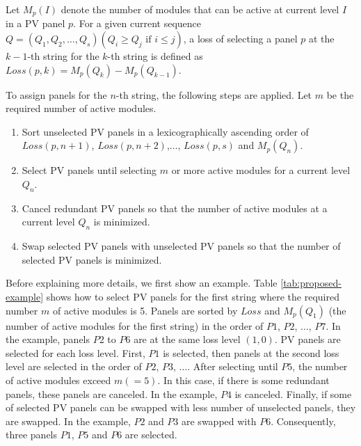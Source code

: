 \documentclass[conference]{IEEEtran}
\begin{document}
Let $M_{p}(I)$ denote the number of modules that can be active at current level $I$ in a PV panel $p$. 
For a given current sequence $Q = (Q_{1},Q_{2},\ldots ,Q_{s}) (Q_{i} \geq Q_{j} \mbox{\ if\ } i \leq j)$, 
a loss of selecting a panel $p$ at the $k-1$-th string for the $k$-th string is defined as 
$Loss(p,k) = M_{p}(Q_{k}) - M_{p}(Q_{k-1})$. 

%

To assign panels for the $n$-th string, the following steps are applied. Let $m$ be the required number of active modules.
\begin{enumerate}
\item Sort unselected PV panels in a lexicographically ascending order of $Loss(p,n+1)$, $Loss(p,n+2)$,$\ldots$, $Loss(p,s)$ and $M_{p}(Q_{n})$.
\item Select PV panels until selecting $m$ or more active modules for a current level $Q_{n}$.
\item Cancel redundant PV panels so that the number of active modules at a current level $Q_{n}$ is minimized.
\item Swap selected PV panels with unselected PV panels so that the number of selected PV panels is minimized.
\end{enumerate}

Before explaining more details, we first show an example. Table \ref{tab:proposed-example} shows how to select PV panels for the first string where the required number $m$ of active modules is 5. 
Panels are sorted by $Loss$ and $M_{p}(Q_{1})$ (the number of active modules for the first string) in the order of $P1$, $P2$, $\ldots$, $P7$. 
In the example, panels $P2$ to $P6$ are at the same loss level $(1,0)$. 
PV panels are selected for each loss level. First, $P1$ is selected, then panels at the second loss level are selected in the order of $P2$, $P3$, $\ldots$. After selecting until $P5$, the number of active modules exceed $m (=5)$. In this case, if there is some redundant panels, these panels are canceled. In the example, $P4$ is canceled. Finally, if some of selected PV panels can be swapped with less number of unselected panels, they are swapped. In the example, $P2$ and $P3$ are swapped with $P6$. Consequently, three panels $P1$, $P5$ and $P6$ are selected. 
\end{document}
